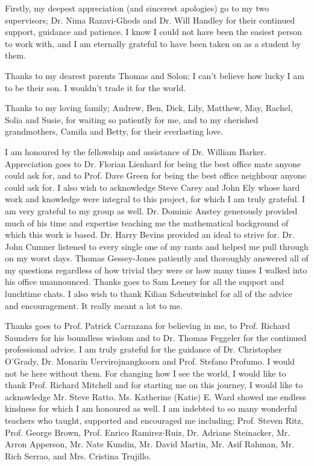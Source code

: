 
\begin{acknowledgements}      

Firstly, my deepest appreciation (and sincerest apologies) go to my two supervisors; Dr. Nima Razavi-Ghods and Dr. Will Handley for their continued support, guidance and patience. I know I could not have been the easiest person to work with, and I am eternally grateful to have been taken on as a student by them.

Thanks to my dearest parents Thomas and Solon; I can’t believe how lucky I am to be their son. I wouldn’t trade it for the world.

Thanks to my loving family; Andrew, Ben, Dick, Lily, Matthew, May, Rachel, Solia and Susie, for waiting so patiently for me, and to my cherished grandmothers, Camila and Betty, for their everlasting love.

I am honoured by the fellowship and assistance of Dr. William Barker. Appreciation goes to Dr. Florian Lienhard for being the best office mate anyone could ask for, and to Prof. Dave Green for being the best office neighbour anyone could ask for. I also wish to acknowledge Steve Carey and John Ely whose hard work and knowledge were integral to this project, for which I am truly grateful. I am very grateful to my group as well. Dr. Dominic Anstey generously provided much of his time and expertise teaching me the mathematical background of which this work is based. Dr. Harry Bevins provided an ideal to strive for. Dr. John Cumner listened to every single one of my rants and helped me pull through on my worst days. Thomas Gessey-Jones patiently and thoroughly answered all of my questions regardless of how trivial they were or how many times I walked into his office unannounced. Thanks goes to Sam Leeney for all the support and lunchtime chats. I also wish to thank Kilian Scheutwinkel for all of the advice and encouragement. It really meant a lot to me.

Thanks goes to Prof. Patrick Carrazana for believing in me, to Prof. Richard Saunders for his boundless wisdom and to Dr. Thomas Feggeler for the continued professional advice. I am truly grateful for the guidance of Dr. Christopher O’Grady, Dr. Monarin Uervirojnangkoorn and Prof. Stefano Profumo. I would not be here without them. For changing how I see the world, I would like to thank Prof. Richard Mitchell and for starting me on this journey, I would like to acknowledge Mr. Steve Ratto. Ms. Katherine (Katie) E. Ward showed me endless kindness for which I am honoured as well. I am indebted to so many wonderful teachers who taught, supported and encouraged me including; Prof. Steven Ritz, Prof. George Brown, Prof. Enrico Ramirez‑Ruiz, Dr. Adriane Steinacker, Mr. Arron Apperson, Mr. Nate Kundin, Mr. David Martin, Mr. Asif Rahman, Mr. Rich Serrao, and Mrs. Cristina Trujillo.


\end{acknowledgements}
